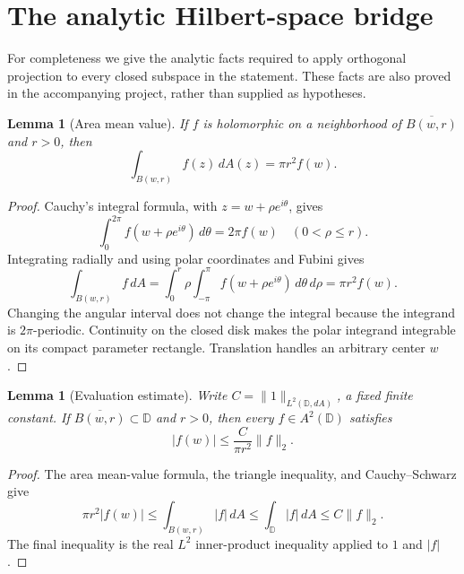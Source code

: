 \documentclass[11pt]{article}
\newtheorem{lemma}[theorem]{Lemma}
\newcommand{\D}{\mathbb D}
\newcommand{\A}{A^2(\D)}
\newcommand{\norm}[1]{\lVert #1\rVert}
\begin{document}
\section{The analytic Hilbert-space bridge}
For completeness we give the analytic facts required to apply orthogonal
projection to every closed subspace in the statement. These facts are also
proved in the accompanying project, rather than supplied as hypotheses.

\begin{lemma}[Area mean value]\label{lem:mean}
If $f$ is holomorphic on a neighborhood of $\overline{B(w,r)}$ and $r>0$, then
\[
 \int_{B(w,r)}f(z)\,dA(z)=\pi r^2 f(w).
\]
\end{lemma}
\begin{proof}
Cauchy's integral formula, with $z=w+\rho e^{i\theta}$, gives
\[
 \int_0^{2\pi} f(w+\rho e^{i\theta})\,d\theta=2\pi f(w)
 \quad(0<\rho\leq r).
\]
Integrating radially and using polar coordinates and Fubini gives
\[
 \int_{B(w,r)}f\,dA
 =\int_0^r\rho\!\int_{-\pi}^{\pi}f(w+\rho e^{i\theta})\,d\theta\,d\rho
 =\pi r^2 f(w).
\]
Changing the angular interval does not change the integral because the
integrand is $2\pi$-periodic. Continuity on the closed disk makes the polar
integrand integrable on its compact parameter rectangle. Translation handles
an arbitrary center $w$.
\end{proof}

\begin{lemma}[Evaluation estimate]\label{lem:eval}
Write $C=\norm{1}_{L^2(\D,dA)}$, a fixed finite constant. If
$\overline{B(w,r)}\subset\D$ and $r>0$, then every $f\in\A$ satisfies
\[
 |f(w)|\leq\frac{C}{\pi r^2}\norm f_2.
\]
\end{lemma}
\begin{proof}
The area mean-value formula, the triangle inequality, and Cauchy--Schwarz give
\[
 \pi r^2|f(w)|
 \leq\int_{B(w,r)}|f|\,dA
 \leq\int_\D|f|\,dA
 \leq C\norm f_2.
\]
The final inequality is the real $L^2$ inner-product inequality applied to
$1$ and $|f|$.
\end{proof}
\end{document}
